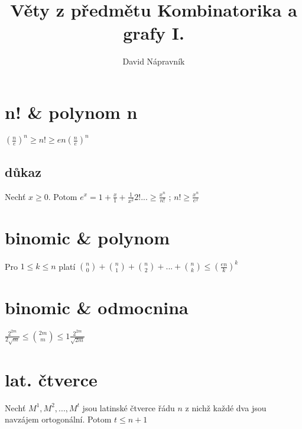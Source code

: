 \documentclass[10pt,a4paper]{article}
\begin{document}
\title{Věty z předmětu Kombinatorika a grafy I.}
\author{David Nápravník}
\maketitle


\tableofcontents
\section{n! \& polynom n}
$
(\frac{n}{e})^n \geq n! \geq en(\frac{n}{e})^n
$
\subsection*{důkaz}
Nechť $x \geq 0$. Potom $e^x = 1 + \frac{x}{1}+\frac1{x^2}{2!} ... \geq \frac{x^n}{n!}$ ; $n! \geq \frac{x^n}{e^x}$

\section{binomic \& polynom}
Pro $ 1 \leq k \leq n $ platí
$
\binom{n}{0}+\binom{n}{1}+\binom{n}{2}+...+\binom{n}{k} \leq (\frac{en}{k})^k
$

\section{binomic \& odmocnina}
$
\frac{2^{2m}}{2\sqrt{m}} \leq
\binom{2m}{m} \leq1
\frac{2^{2m}}{\sqrt{2m}}
$


\section{lat. čtverce}
Nechť $M^1, M^2, ..., M^t$ jsou latinské čtverce řádu $n$ z nichž 
každé dva jsou navzájem ortogonální. Potom $t \leq n+1$
\end{document}
